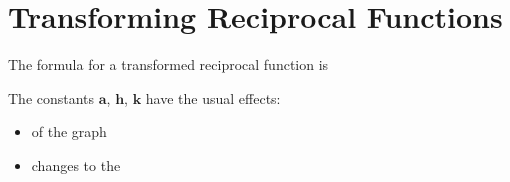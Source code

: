 \section{Transforming Reciprocal Functions}

The formula for a transformed reciprocal function is 
\vspace{-0.5\onelineskip}
\myCenteredBox[width=2.5in,valign=center]{
    \[ f(x) = \frac{\bm{a}}{x-\bm{h}} + \bm{k} \]
}

\vspace{-0.5\onelineskip}

The constants $\bm{a}$, $\bm{h}$, $\bm{k}$ have the usual effects:
\begin{itemize}[nosep]
    \item {} of the graph
    \item changes to the 
\end{itemize}

